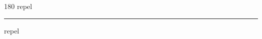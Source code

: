 
\begin{frame}
\begin{center}
\begin{turn}{180}
{\fontsize{2.5cm}{1em}\selectfont repel}
\end{turn}
\vspace{1em}\par  
\hrule
\vspace{1em}\par  
{\fontsize{2.5cm}{1em}\selectfont repel}
\end{center}
\end{frame}
